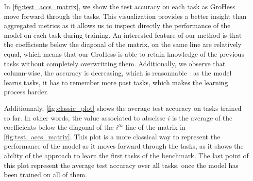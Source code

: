 \documentclass[11pt]{article}
\begin{document}
In \ref{fig:test_accs_matrix}, we show the test accuracy on each task as GroHess move forward through the tasks. This visualization provides a better insight than aggregated metrics as it allows us to inspect directly the performance of the model on each task during training. An interested feature of our method is that the coefficients below the diagonal of the matrix, on the same line are relatively equal, which means that our GroHess is able to retain knowledge of the previous tasks without completely overwritting them. Additionally, we observe that column-wise, the accuracy is decreasing, which is reasonnable : as the model learns tasks, it has to remember more past tasks, which makes the learning process harder.

\vspace{2mm}
\noindent
Additionnaly, \ref{fig:classic_plot} shows the average test accuracy on tasks trained so far. In other words, the value associated to abscisse $i$ is the average of the coefficients below the diagonal of the $i^{th}$ line of the matrix in \ref{fig:test_accs_matrix}. This plot is a more classical way to represent the performance of the model as it moves forward through the tasks, as it shows the ability of the approach to learn the first tasks of the benchmark. The last point of this plot represent the average test accuracy over all tasks, once the model has been trained on all of them.
\end{document}
